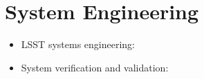 \documentclass[12pt]{article}
\begin{document}
\section{System Engineering}

\begin{itemize}
   \item LSST systems engineering: \cite{2014SPIE.9150E..0MC}
   \item System verification and validation: \cite{2014SPIE.9150E..0NS}
\end{itemize}
%



\printbibliography[heading=bibintoc]
\end{document}

